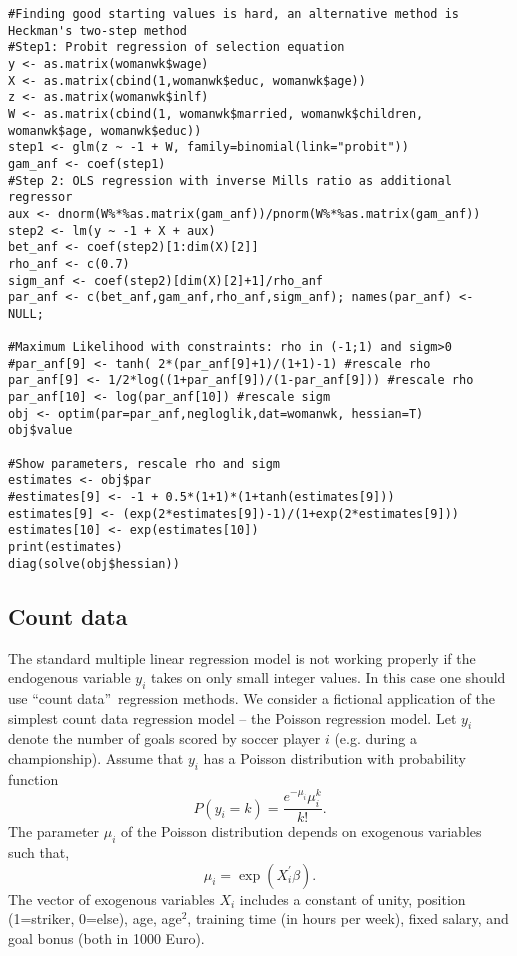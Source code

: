 \documentclass{article}
\begin{document}
\begin{solution}
\begin{enumerate}
\begin{verbatim}
#Finding good starting values is hard, an alternative method is Heckman's two-step method
#Step1: Probit regression of selection equation
y <- as.matrix(womanwk$wage)
X <- as.matrix(cbind(1,womanwk$educ, womanwk$age))
z <- as.matrix(womanwk$inlf)
W <- as.matrix(cbind(1, womanwk$married, womanwk$children, womanwk$age, womanwk$educ))
step1 <- glm(z ~ -1 + W, family=binomial(link="probit"))
gam_anf <- coef(step1)
#Step 2: OLS regression with inverse Mills ratio as additional regressor
aux <- dnorm(W%*%as.matrix(gam_anf))/pnorm(W%*%as.matrix(gam_anf))
step2 <- lm(y ~ -1 + X + aux)
bet_anf <- coef(step2)[1:dim(X)[2]]
rho_anf <- c(0.7)
sigm_anf <- coef(step2)[dim(X)[2]+1]/rho_anf
par_anf <- c(bet_anf,gam_anf,rho_anf,sigm_anf); names(par_anf) <- NULL;

#Maximum Likelihood with constraints: rho in (-1;1) and sigm>0
#par_anf[9] <- tanh( 2*(par_anf[9]+1)/(1+1)-1) #rescale rho
par_anf[9] <- 1/2*log((1+par_anf[9])/(1-par_anf[9])) #rescale rho
par_anf[10] <- log(par_anf[10]) #rescale sigm
obj <- optim(par=par_anf,negloglik,dat=womanwk, hessian=T)
obj$value

#Show parameters, rescale rho and sigm
estimates <- obj$par
#estimates[9] <- -1 + 0.5*(1+1)*(1+tanh(estimates[9]))
estimates[9] <- (exp(2*estimates[9])-1)/(1+exp(2*estimates[9]))
estimates[10] <- exp(estimates[10])
print(estimates)
diag(solve(obj$hessian))
\end{verbatim}

\end{enumerate}
\end{solution}
\newpage
\subsection{Count data}\label{mlcountdata}

The standard multiple linear regression model is not working properly if the
endogenous variable $y_{i}$ takes on only small integer values. In this case
one should use \textquotedblleft count data\textquotedblright\ regression
methods. We consider a fictional application of the simplest count data
regression model -- the Poisson regression model. Let $y_{i}$ denote the
number of goals scored by soccer player $i$ (e.g. during a championship).
Assume that $y_{i}$ has a Poisson distribution with probability function%
\begin{equation*}
P\left( y_{i}=k\right) =\frac{e^{-\mu _{i}}\mu _{i}^{k}}{k!}.
\end{equation*}%
The parameter $\mu _{i}$ of the Poisson distribution depends on exogenous
variables such that,%
\begin{equation*}
\mu _{i}=\exp \left( X_{i}^{\prime }\beta \right) .
\end{equation*}%
The vector of exogenous variables $X_{i}$ includes a constant of unity,
position (1=striker, 0=else), age, age$^{2}$, training time (in hours per
week), fixed salary, and goal bonus (both in 1000 Euro).
\end{document}
